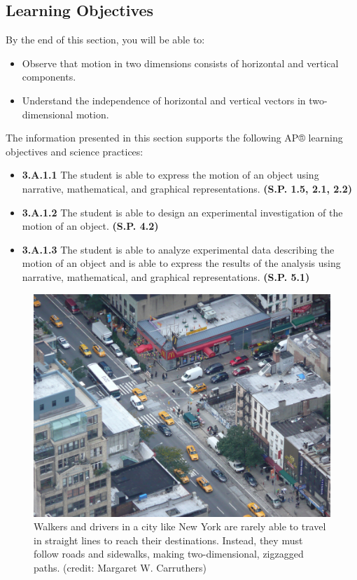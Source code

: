 \documentclass[
]{book}
\providecommand{\tightlist}{%
  \setlength{\itemsep}{0pt}\setlength{\parskip}{0pt}}
\begin{document}
\hypertarget{fs-id1263980}{}
\hypertarget{learning-objectives-7}{%
\subsection{Learning Objectives}\label{learning-objectives-7}}

By the end of this section, you will be able to:

\begin{itemize}
\tightlist
\item
  Observe that motion in two dimensions consists of horizontal and
  vertical components.
\item
  Understand the independence of horizontal and vertical vectors in
  two-dimensional motion.
\end{itemize}

The information presented in this section supports the following AP®
learning objectives and science practices:

\begin{itemize}
\tightlist
\item
  \textbf{3.A.1.1} The student is able to express the motion of an object
  using narrative, mathematical, and graphical representations.
  \textbf{(S.P. 1.5, 2.1, 2.2)}
\item
  \textbf{3.A.1.2} The student is able to design an experimental
  investigation of the motion of an object. \textbf{(S.P. 4.2)}
\item
  \textbf{3.A.1.3} The student is able to analyze experimental data
  describing the motion of an object and is able to express the
  results of the analysis using narrative, mathematical, and graphical
  representations. \textbf{(S.P. 5.1)}
\end{itemize}

\begin{figure}
\hypertarget{import-auto-id1165298608692}{%
\centering
\includegraphics{images/Figure_03_01_00.jpg}
\caption{Walkers and drivers in a city like New York are rarely able to travel
in straight lines to reach their destinations. Instead, they must follow
roads and sidewalks, making two-dimensional, zigzagged paths. (credit:
Margaret W.
Carruthers)}\label{import-auto-id1165298608692}
}
\end{figure}
\end{document}
